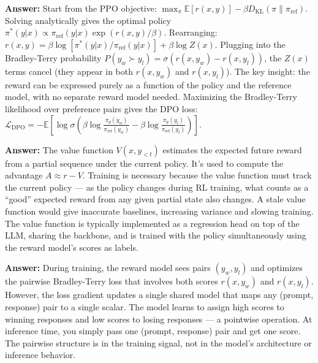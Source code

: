 \documentclass[11pt, a4paper]{article}
\begin{document}
\begin{notebox}
\textbf{Answer:} Start from the PPO objective: $\max_\pi \mathbb{E}[r(x,y)] - \beta D_{\text{KL}}(\pi \| \pi_{\text{ref}})$. Solving analytically gives the optimal policy $\pi^*(y|x) \propto \pi_{\text{ref}}(y|x) \exp(r(x,y)/\beta)$. Rearranging: $r(x,y) = \beta \log[\pi^*(y|x)/\pi_{\text{ref}}(y|x)] + \beta \log Z(x)$. Plugging into the Bradley-Terry probability $P(y_w \succ y_l) = \sigma(r(x,y_w) - r(x,y_l))$, the $Z(x)$ terms cancel (they appear in both $r(x,y_w)$ and $r(x,y_l)$). The key insight: the reward can be expressed purely as a function of the policy and the reference model, with no separate reward model needed. Maximizing the Bradley-Terry likelihood over preference pairs gives the DPO loss:
$\mathcal{L}_{\text{DPO}} = -\mathbb{E}[\log \sigma(\beta \log \frac{\pi_\theta(y_w)}{\pi_{\text{ref}}(y_w)} - \beta \log \frac{\pi_\theta(y_l)}{\pi_{\text{ref}}(y_l)})]$.
\end{notebox}

\begin{notebox}
\textbf{Answer:} The value function $V(x, y_{<t})$ estimates the expected future reward from a partial sequence under the current policy. It's used to compute the advantage $A \approx r - V$. Training is necessary because the value function must track the current policy --- as the policy changes during RL training, what counts as a ``good'' expected reward from any given partial state also changes. A stale value function would give inaccurate baselines, increasing variance and slowing training. The value function is typically implemented as a regression head on top of the LLM, sharing the backbone, and is trained with the policy simultaneously using the reward model's scores as labels.
\end{notebox}

\begin{notebox}
\textbf{Answer:} During training, the reward model sees pairs $(y_w, y_l)$ and optimizes the pairwise Bradley-Terry loss that involves both scores $r(x,y_w)$ and $r(x,y_l)$. However, the loss gradient updates a single shared model that maps any (prompt, response) pair to a single scalar. The model learns to assign high scores to winning responses and low scores to losing responses --- a pointwise operation. At inference time, you simply pass one (prompt, response) pair and get one score. The pairwise structure is in the training signal, not in the model's architecture or inference behavior.
\end{notebox}
\end{document}
